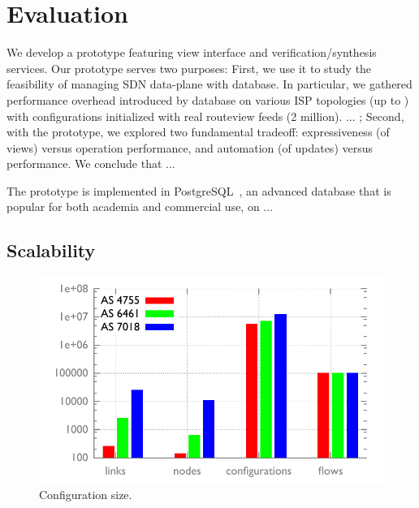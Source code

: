 \section{Evaluation}
\label{sec:eval}


We develop a prototype featuring view interface and
verification/synthesis services. Our prototype serves two purposes:
First, we use it to study the feasibility of managing SDN data-plane
with database. In particular, we gathered performance overhead
introduced by database on various ISP topologies (up to ) with
configurations initialized with real routeview feeds (2
million). ... ; Second, with the prototype, we explored two
fundamental tradeoff: expressiveness (of views) versus operation
performance, and automation (of updates) versus performance. We
conclude that ...

The prototype is implemented in PostgreSQL~\cite{postgres}, an
advanced database that is popular for both academia and commercial
use, on ... %

\subsection{Scalability}

\begin{figure}
  \centering
  \includegraphics[width=1\linewidth]{figures/init.pdf}
  \caption{Configuration size.}
  \label{fig:init}
\end{figure}

